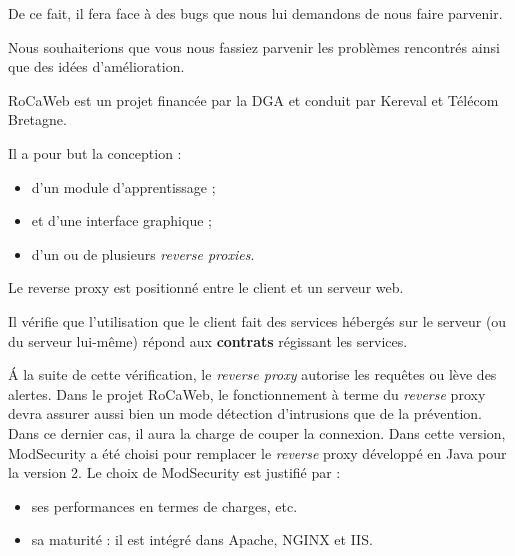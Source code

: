 \documentclass[a4paper,10pt,justified,openany]{tufte-book}
\begin{document}
De ce fait, il fera face à des bugs que nous lui demandons de nous faire parvenir. 


Nous souhaiterions que vous nous fassiez parvenir les problèmes rencontrés ainsi que des idées d'amélioration.
 

RoCaWeb est un projet financée par la DGA et conduit par Kereval et Télécom Bretagne.


Il a pour but la conception :
\begin{itemize}
\item d'un module d'apprentissage ; 
\item et d'une interface graphique ;
\item d'un ou de plusieurs \textit{reverse proxies}.
 
\end{itemize}
 
Le reverse proxy est positionné entre le client et un serveur web.


Il vérifie que l'utilisation que le client fait des services hébergés sur le serveur (ou du serveur lui-même) répond aux \textbf{contrats} régissant les services.
 
 
\'A la suite de cette vérification, le \textit{reverse proxy} autorise les requêtes ou lève des alertes. 
Dans le projet RoCaWeb, le fonctionnement à terme du \textit{reverse} proxy devra assurer aussi bien un mode détection d'intrusions que de la prévention. 
Dans ce dernier cas, il aura la charge de couper la connexion.
Dans cette version, ModSecurity a été choisi pour remplacer le \textit{reverse} proxy développé en Java pour la version 2. 
Le choix de ModSecurity est justifié par : 
\begin{itemize}
 \item ses performances en termes de charges, etc. 
 \item sa maturité : il est intégré dans Apache, NGINX et IIS.  
\end{itemize}
\end{document}
